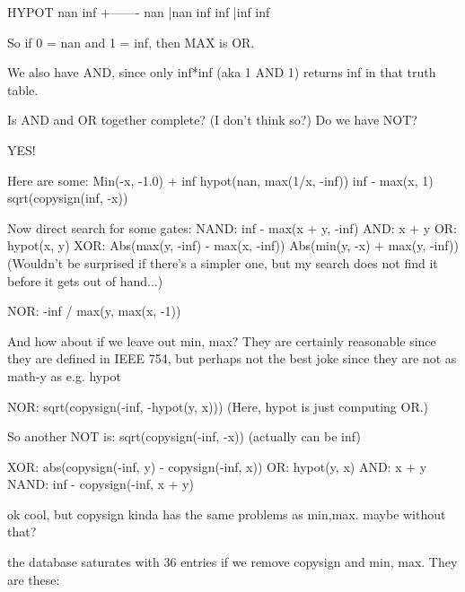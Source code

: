 \documentclass[twocolumn]{article}
\begin{document}
                    HYPOT  nan inf
                          +-------
                      nan |nan inf
                      inf |inf inf

        So if 0 = nan and 1 = inf, then MAX is OR.

        We also have AND, since only inf*inf (aka 1 AND 1)
        returns inf in that truth table.

        Is AND and OR together complete? (I don't think so?)
        Do we have NOT?


YES!

Here are some:
Min(-x, -1.0) + inf
hypot(nan, max(1/x, -inf))
inf - max(x, 1)
sqrt(copysign(inf, -x))


Now direct search for some gates:
NAND: inf - max(x + y, -inf)
AND: x + y
OR: hypot(x, y)
XOR: Abs(max(y, -inf) - max(x, -inf))
     Abs(min(y, -x) + max(y, -inf))
     (Wouldn't be surprised if there's a simpler one,
     but my search does not find it before it gets
     out of hand...)
    
NOR: -inf / max(y, max(x, -1))
     


And how about if we leave out min, max? They are certainly
reasonable since they are defined in IEEE 754, but perhaps
not the best joke since they are not as math-y as e.g. hypot


NOR: sqrt(copysign(-inf, -hypot(y, x)))
(Here, hypot is just computing OR.)

So another NOT is:
sqrt(copysign(-inf, -x))  (actually can be inf)

XOR: abs(copysign(-inf, y) - copysign(-inf, x))
OR: hypot(y, x)
AND: x + y
NAND: inf - copysign(-inf, x + y)


ok cool, but copysign kinda has the same problems as min,max.
maybe without that?


the database saturates with 36 entries if we remove
copysign and min, max. They are these:
\end{document}
